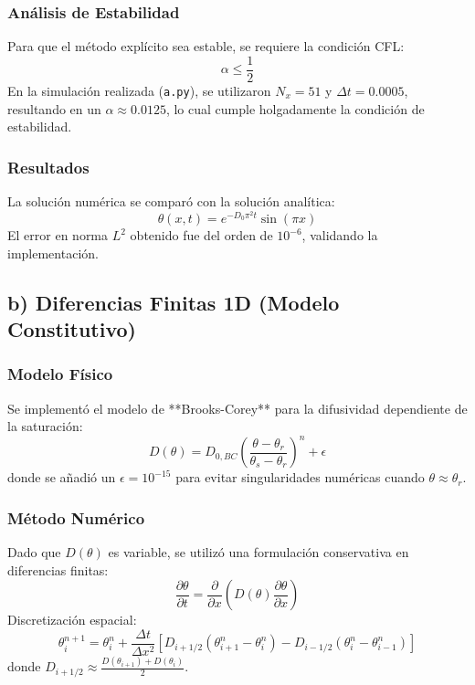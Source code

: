 \documentclass[a4paper,12pt]{article}
\begin{document}
\subsubsection*{Análisis de Estabilidad}
Para que el método explícito sea estable, se requiere la condición CFL:
\begin{equation}
    \alpha \le \frac{1}{2}
\end{equation}
En la simulación realizada (\texttt{a.py}), se utilizaron $N_x=51$ y $\Delta t=0.0005$, resultando en un $\alpha \approx 0.0125$, lo cual cumple holgadamente la condición de estabilidad.

\subsubsection*{Resultados}
La solución numérica se comparó con la solución analítica:
\begin{equation}
    \theta(x,t) = e^{-D_0 \pi^2 t} \sin(\pi x)
\end{equation}
El error en norma $L^2$ obtenido fue del orden de $10^{-6}$, validando la implementación.

\subsection{b) Diferencias Finitas 1D (Modelo Constitutivo)}

\subsubsection*{Modelo Físico}
Se implementó el modelo de **Brooks-Corey** para la difusividad dependiente de la saturación:
\begin{equation}
    D(\theta) = D_{0,BC} \left( \frac{\theta - \theta_r}{\theta_s - \theta_r} \right)^n + \epsilon
\end{equation}
donde se añadió un $\epsilon=10^{-15}$ para evitar singularidades numéricas cuando $\theta \approx \theta_r$.

\subsubsection*{Método Numérico}
Dado que $D(\theta)$ es variable, se utilizó una formulación conservativa en diferencias finitas:
\begin{equation}
    \frac{\partial\theta}{\partial t} = \frac{\partial}{\partial x} \left( D(\theta) \frac{\partial\theta}{\partial x} \right)
\end{equation}
Discretización espacial:
\begin{equation}
    \theta_i^{n+1} = \theta_i^n + \frac{\Delta t}{\Delta x^2} \left[ D_{i+1/2} (\theta_{i+1}^n - \theta_i^n) - D_{i-1/2} (\theta_i^n - \theta_{i-1}^n) \right]
\end{equation}
donde $D_{i+1/2} \approx \frac{D(\theta_{i+1}) + D(\theta_i)}{2}$.
\end{document}
